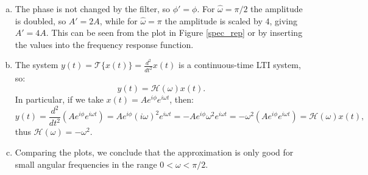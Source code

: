 \begin{enumerate}
\begin{enumerate}[a)]
\item The phase is not changed by the filter, so $\phi'=\phi$. For $\hat{\omega}=\pi/2$ the amplitude is doubled, so $A'=2A$, while for $\hat{\omega}=\pi$ the amplitude is scaled by $4$, giving $A'=4A$. 
This can be seen from the plot in Figure \ref{spec_rep} or by inserting the values into the frequency response function. 

\item The system $y(t)=\mathcal{T}\{x(t)\}=\frac{d^{2}}{dt^{2}}x(t)$ is a continuous-time LTI system, so:
$$y(t)=\mathcal{H}(\omega)x(t).$$
In particular, if we take $x(t)=Ae^{i\phi}e^{i\omega t}$, then:
$$y(t)=\frac{d^{2}}{dt^{2}}(Ae^{i\phi}e^{i\omega t})=Ae^{i\phi}(i\omega)^{2}e^{i\omega t}=-Ae^{i\phi}\omega^{2}e^{i\omega t}=-\omega^{2}(Ae^{i\phi}e^{i\omega t})=\mathcal{H}(\omega)x(t),$$
thus $\mathcal{H}(\omega)=-\omega^{2}$. 

\item Comparing the plots, we conclude that the approximation is only good for small angular frequencies in the range $0<\omega<\pi/2$. 
\end{enumerate}

\end{enumerate}


